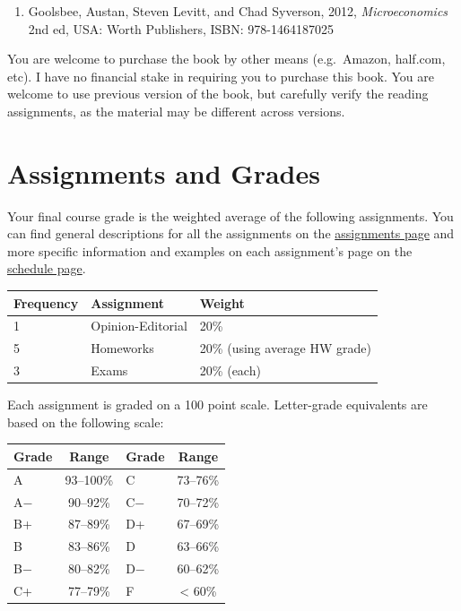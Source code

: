 \documentclass{article}
\providecommand{\tightlist}{%
  \setlength{\itemsep}{0pt}\setlength{\parskip}{0pt}}
\begin{document}
\begin{enumerate}
\def\labelenumi{\arabic{enumi}.}
\tightlist
\item
  Goolsbee, Austan, Steven Levitt, and Chad Syverson, 2012,
  \emph{Microeconomics} 2nd ed, USA: Worth Publishers, ISBN:
  978-1464187025
\end{enumerate}

You are welcome to purchase the book by other means (e.g.~Amazon,
half.com, etc). I have no financial stake in requiring you to purchase
this book. You are welcome to use previous version of the book, but
carefully verify the reading assignments, as the material may be
different across versions.

\hypertarget{assignments-and-grades}{%
\section{Assignments and Grades}\label{assignments-and-grades}}

Your final course grade is the weighted average of the following
assignments. You can find general descriptions for all the assignments
on the \href{assignments/}{assignments page} and more specific
information and examples on each assignment's page on the
\href{schedule/}{schedule page}.

\begin{tabular}{l|l|l}
\hline
Frequency & Assignment & Weight\\
\hline
1 & Opinion-Editorial & 20\%\\
\hline
5 & Homeworks & 20\% (using average HW grade)\\
\hline
3 & Exams & 20\% (each)\\
\hline
\end{tabular}

Each assignment is graded on a 100 point scale. Letter-grade equivalents
are based on the following scale:

\begin{table}
\centering
\begin{tabular}{l|c|l|c}
\hline
Grade & Range & Grade & Range\\
\hline
A & 93–100\% & C & 73–76\%\\
\hline
A− & 90–92\% & C− & 70–72\%\\
\hline
B+ & 87–89\% & D+ & 67–69\%\\
\hline
B & 83–86\% & D & 63–66\%\\
\hline
B− & 80–82\% & D− & 60–62\%\\
\hline
C+ & 77–79\% & F & < 60\%\\
\hline
\end{tabular}
\end{table}
\end{document}
